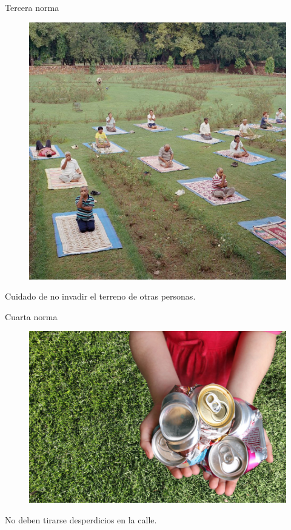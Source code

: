 \documentclass{beamer}
\begin{document}
\begin{frame}{Tercera norma}
\begin{figure}
\includegraphics[scale=.175]{Images/NORMA3.png} 
\end{figure}
\begin{center}
Cuidado de no invadir el terreno de otras personas.
\end{center}
\end{frame}
\begin{frame}{Cuarta norma}
\begin{figure}
\includegraphics[scale=.25]{Images/NORMA4.jpg}
\end{figure}
\begin{center}
No deben tirarse desperdicios en la calle.
\end{center}
\end{frame}
\end{document}
